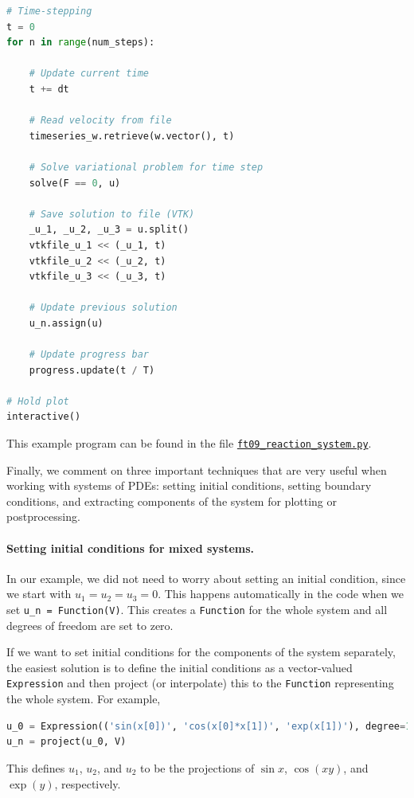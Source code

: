 \documentclass[graybox,envcountchap,sectrefs,final]{svmonodo}
\begin{document}
\begin{lstlisting}[language=Python,style=graycolor]
# Time-stepping
t = 0
for n in range(num_steps):

    # Update current time
    t += dt

    # Read velocity from file
    timeseries_w.retrieve(w.vector(), t)

    # Solve variational problem for time step
    solve(F == 0, u)

    # Save solution to file (VTK)
    _u_1, _u_2, _u_3 = u.split()
    vtkfile_u_1 << (_u_1, t)
    vtkfile_u_2 << (_u_2, t)
    vtkfile_u_3 << (_u_3, t)

    # Update previous solution
    u_n.assign(u)

    # Update progress bar
    progress.update(t / T)

# Hold plot
interactive()
\end{lstlisting}
This example program can be found in the file \href{{https://fenicsproject.org/pub/tutorial/python/vol1/ft09_reaction_system.py}}{\nolinkurl{ft09_reaction_system.py}}.


Finally, we comment on three important techniques that are very useful
when working with systems of PDEs: setting initial conditions, setting
boundary conditions, and extracting components of the system for
plotting or postprocessing.

\paragraph{Setting initial conditions for mixed systems.}

In our example, we did not need to worry about setting an initial
condition, since we start with $u_1 = u_2 = u_3 = 0$. This happens
automatically in the code when we set \Verb!u_n = Function(V)!. This
creates a \texttt{Function} for the whole system and all degrees of freedom
are set to zero.

If we want to set initial conditions for the components of the system
separately, the easiest solution is to define the initial conditions
as a vector-valued \texttt{Expression} and then project (or interpolate) this
to the \texttt{Function} representing the whole system. For example,

\begin{lstlisting}[language=Python,style=graycolor]
u_0 = Expression(('sin(x[0])', 'cos(x[0]*x[1])', 'exp(x[1])'), degree=1)
u_n = project(u_0, V)
\end{lstlisting}
This defines $u_1$, $u_2$, and $u_2$ to be the projections of $\sin
x$, $\cos (xy)$, and $\exp(y)$, respectively.
\end{document}
